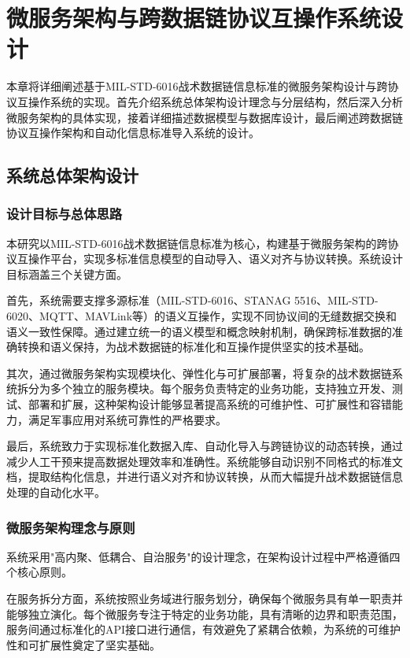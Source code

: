 \chapter{微服务架构与跨数据链协议互操作系统设计}

本章将详细阐述基于MIL-STD-6016战术数据链信息标准的微服务架构设计与跨协议互操作系统的实现。首先介绍系统总体架构设计理念与分层结构，然后深入分析微服务架构的具体实现，接着详细描述数据模型与数据库设计，最后阐述跨数据链协议互操作架构和自动化信息标准导入系统的设计。

\section{系统总体架构设计}

\subsection{设计目标与总体思路}

本研究以MIL-STD-6016战术数据链信息标准为核心，构建基于微服务架构的跨协议互操作平台，实现多标准信息模型的自动导入、语义对齐与协议转换。系统设计目标涵盖三个关键方面。

首先，系统需要支撑多源标准（MIL-STD-6016、STANAG 5516、MIL-STD-6020、MQTT、MAVLink等）的语义互操作，实现不同协议间的无缝数据交换和语义一致性保障。通过建立统一的语义模型和概念映射机制，确保跨标准数据的准确转换和语义保持，为战术数据链的标准化和互操作提供坚实的技术基础。

其次，通过微服务架构实现模块化、弹性化与可扩展部署，将复杂的战术数据链系统拆分为多个独立的服务模块。每个服务负责特定的业务功能，支持独立开发、测试、部署和扩展，这种架构设计能够显著提高系统的可维护性、可扩展性和容错能力，满足军事应用对系统可靠性的严格要求。

最后，系统致力于实现标准化数据入库、自动化导入与跨链协议的动态转换，通过减少人工干预来提高数据处理效率和准确性。系统能够自动识别不同格式的标准文档，提取结构化信息，并进行语义对齐和协议转换，从而大幅提升战术数据链信息处理的自动化水平。

\subsection{微服务架构理念与原则}

系统采用"高内聚、低耦合、自治服务"的设计理念，在架构设计过程中严格遵循四个核心原则。

在服务拆分方面，系统按照业务域进行服务划分，确保每个微服务具有单一职责并能够独立演化。每个微服务专注于特定的业务功能，具有清晰的边界和职责范围，服务间通过标准化的API接口进行通信，有效避免了紧耦合依赖，为系统的可维护性和可扩展性奠定了坚实基础。

